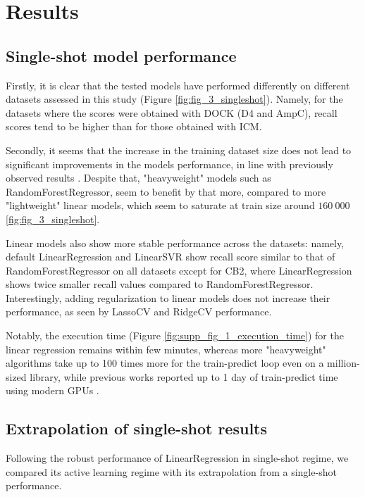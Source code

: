 \section{Results}

\subsection{Single-shot model performance}
\label{subsection:single-shot}

Firstly, it is clear that the tested models have performed differently on different datasets assessed in this study (Figure \ref{fig:fig_3_singleshot}). Namely, for the datasets where the scores were obtained with DOCK (D4 and AmpC), recall scores tend to be higher than for those obtained with ICM.

Secondly, it seems that the increase in the training dataset size does not lead to significant improvements in the models performance, in line with previously observed results \cite{Yang2021_shoichet_active_learning}. Despite that, "heavyweight" models such as RandomForestRegressor, seem to benefit by that more, compared to more "lightweight" linear models, which seem to saturate at train size around $160\ 000$ \ref{fig:fig_3_singleshot}.

Linear models also show more stable performance across the datasets: namely, default LinearRegression and LinearSVR show recall score similar to that of RandomForestRegressor on all datasets except for CB2, where LinearRegression shows twice smaller recall values compared to RandomForestRegressor. Interestingly, adding regularization to linear models does not increase their performance, as seen by LassoCV and RidgeCV performance.

Notably, the execution time (Figure \ref{fig:supp_fig_1_execution_time}) for the linear regression remains within few minutes, whereas more "heavyweight" algorithms take up to 100 times more for the train-predict loop even on a million-sized library, while previous works reported up to 1 day of train-predict time using modern GPUs \cite{deepdocking}.

\subsection{Extrapolation of single-shot results}
Following the robust performance of LinearRegression in single-shot regime, we compared its active learning regime with its extrapolation from a single-shot performance.

